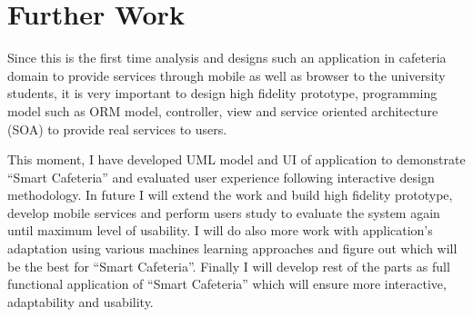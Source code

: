 \section{Further Work}
\label{sec:FurtherWork}
Since this is the first time analysis and designs such an application in
cafeteria domain to provide services through mobile as well as browser to the
university students, it is very important to design high fidelity prototype,
programming model such as ORM model, controller, view and service oriented
architecture (SOA) to provide real services to users.


This moment, I have developed UML model and UI of application to demonstrate
``Smart Cafeteria'' and evaluated user experience following interactive design
methodology.  In future I will extend the work and build high fidelity
prototype, develop mobile services and perform users study to evaluate the
system again until maximum level of usability. I will do also more work with
application's adaptation using various machines learning approaches and figure
out which will be the best for ``Smart Cafeteria''. Finally I will develop rest of
the parts as full functional application of ``Smart Cafeteria'' which will ensure
more interactive, adaptability and usability.

